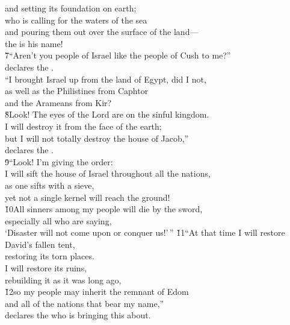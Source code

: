 \begin{poetry}
\poemll    and setting its foundation on earth; \\
\poeml who is calling for the waters of the sea \\
\poemll    and pouring them out over the surface of the land--- \\
\poemlll       the  is his name! \\
\poeml \v{7}``Aren't you people of Israel like the people of Cush to me?'' \\
\poemll    declares the . \\
\poeml ``I brought Israel up from the land of Egypt, did I not, \\
\poemll    as well as the Philistines from Caphtor \\
\poemlll       and the Arameans from Kir? \\
\poeml \v{8}Look! The eyes of the Lord  are on the sinful kingdom. \\
\poemll    I will destroy it from the face of the earth; \\
\poeml but I will not totally destroy the house of Jacob,'' \\
\poemll    declares the . \\
\poeml \v{9}``Look! I'm giving the order: \\
\poemll    I will sift the house of Israel throughout all the nations, \\
\poemlll       as one sifts with a sieve, \\
\poemll    yet not a single kernel will reach the ground! \\
\poeml \v{10}All sinners among my people will die by the sword, \\
\poemll    especially all who are saying, \\
\poemlll       `Disaster will not come upon or conquer us!'\,''
\poeml \v{11}``At that time I will restore David's fallen tent, \\
\poemll    restoring its torn places. \\
\poeml I will restore its ruins, \\
\poemll    rebuilding it as it was long ago, \\
\poeml \v{12}so my people may inherit the remnant of Edom \\
\poemll    and all of the nations that bear my name,'' \\
\poemlll       declares the  who is bringing this about. \\

\end{poetry}
